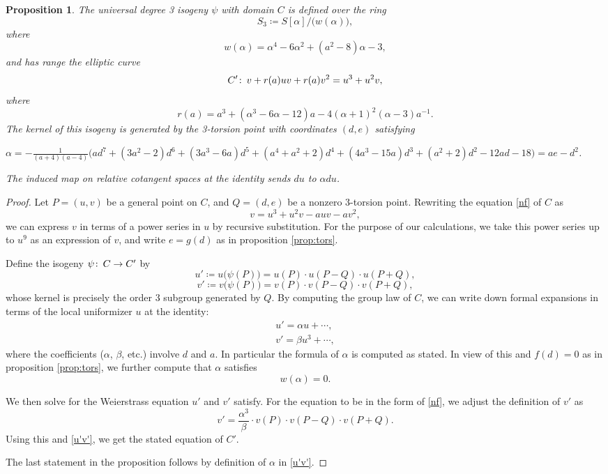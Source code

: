 \documentclass{gtpart}
\newtheorem{prop}[thm]{Proposition}
\theoremstyle{definition}
\theoremstyle{remark}
\def\co{\colon\thinspace}
\newcommand{\A}{\alpha}
\begin{document}
\begin{prop}
\label{prop:isog}
 The universal degree 3 isogeny $\psi$ with domain $C$ is defined over the ring 
 \[
  S_3 \coloneqq S[\A] \big/ \big( w(\A) \big), 
 \]
 where 
 \[
  w(\A) = \A^4 - 6 \A^2 + (a^2 - 8) \A - 3, 
 \]
 and has range the elliptic curve 
 \[
  C' \co v + r(a) u v + r(a) v^2 = u^3 + u^2 v, 
 \]
 where 
 \[
  r(a) = a^3 + (\A^3 - 6 \A - 12) a - 4 (\A + 1)^2 (\A - 3) a^{-1}.  
 \]
 The kernel of this isogeny is generated by the 3-torsion point with coordinates $(d,e)$ satisfying 

 $\A = -\frac{1}{(a + 4) (a - 4)} \big(a d^7 + (3 a^2 - 2) d^6 + (3 a^3 - 6 a) d^5 + (a^4 + a^2 + 2) d^4 + (4 a^3 - 15 a) d^3 + (a^2 + 2) d^2 - 12 a d -18\big) = a e - d^2$.  

 The induced map on relative cotangent spaces at the identity sends $du$ to $\A du$.  
\end{prop}
\begin{proof}
 Let $P = (u,v)$ be a general point on $C$, and $Q = (d,e)$ be a nonzero 3-torsion point.  
 Rewriting the equation \eqref{nf} of $C$ as 
 \[
  v = u^3 + u^2 v - a u v - a v^2, 
 \]
 we can express $v$ in terms of a power series in $u$ by recursive substitution.  
 For the purpose of our calculations, we take this power series up to $u^9$ as an expression of $v$, 
 and write $e = g(d)$ as in proposition \ref{prop:tors}.  

 Define the isogeny $\psi \co C \to C'$ by 
 \[
  u' \coloneqq u\big(\psi(P)\big) = u(P) \cdot u(P-Q) \cdot u(P+Q), 
 \]
 \[
  v' \coloneqq v\big(\psi(P)\big) = v(P) \cdot v(P-Q) \cdot v(P+Q), 
 \]
 whose kernel is precisely the order 3 subgroup generated by $Q$.  
 By computing the group law of $C$, we can write down formal expansions in terms of the local uniformizer $u$ at the identity: 
 \begin{equation}
 \label{u'v'}
  \begin{array}{lll}
   u' = \A u + \cdots, \\
   v' = \beta u^3 + \cdots, 
  \end{array}
 \end{equation}
 where the coefficients ($\A$, $\beta$, etc.) involve $d$ and $a$.  In particular the formula of $\A$ is computed as stated.  
 In view of this and $f(d) = 0$ as in proposition \ref{prop:tors}, we further compute that $\A$ satisfies 
 \[
  w(\A) = 0.  
 \]

 We then solve for the Weierstrass equation $u'$ and $v'$ satisfy.  
 For the equation to be in the form of \eqref{nf}, we adjust the definition of $v'$ as 
 \[
  v' = \frac{\A^3}{\beta} \cdot v(P) \cdot v(P-Q) \cdot v(P+Q).  
 \]
 Using this and \eqref{u'v'}, we get the stated equation of $C'$.  

 The last statement in the proposition follows by definition of $\A$ in \eqref{u'v'}.  
\end{proof}
\end{document}

